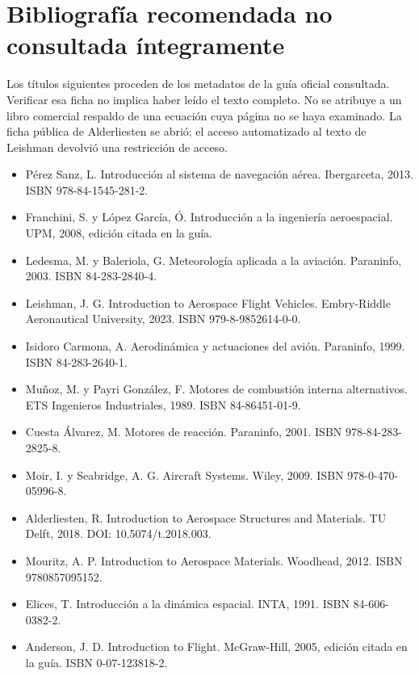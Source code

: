 \chapter*{Bibliografía recomendada no consultada íntegramente}
Los títulos siguientes proceden de los metadatos de la guía oficial consultada. Verificar esa ficha no implica haber leído el texto completo. No se atribuye a un libro comercial respaldo de una ecuación cuya página no se haya examinado. La ficha pública de Alderliesten se abrió; el acceso automatizado al texto de Leishman devolvió una restricción de acceso.
\begin{itemize}
\item Pérez Sanz, L. Introducción al sistema de navegación aérea. Ibergarceta, 2013. ISBN 978-84-1545-281-2.
\item Franchini, S. y López García, Ó. Introducción a la ingeniería aeroespacial. UPM, 2008, edición citada en la guía.
\item Ledesma, M. y Baleriola, G. Meteorología aplicada a la aviación. Paraninfo, 2003. ISBN 84-283-2840-4.
\item Leishman, J. G. Introduction to Aerospace Flight Vehicles. Embry-Riddle Aeronautical University, 2023. ISBN 979-8-9852614-0-0.
\item Isidoro Carmona, A. Aerodinámica y actuaciones del avión. Paraninfo, 1999. ISBN 84-283-2640-1.
\item Muñoz, M. y Payri González, F. Motores de combustión interna alternativos. ETS Ingenieros Industriales, 1989. ISBN 84-86451-01-9.
\item Cuesta Álvarez, M. Motores de reacción. Paraninfo, 2001. ISBN 978-84-283-2825-8.
\item Moir, I. y Seabridge, A. G. Aircraft Systems. Wiley, 2009. ISBN 978-0-470-05996-8.
\item Alderliesten, R. Introduction to Aerospace Structures and Materials. TU Delft, 2018. DOI: 10.5074/t.2018.003.
\item Mouritz, A. P. Introduction to Aerospace Materials. Woodhead, 2012. ISBN 9780857095152.
\item Elices, T. Introducción a la dinámica espacial. INTA, 1991. ISBN 84-606-0382-2.
\item Anderson, J. D. Introduction to Flight. McGraw-Hill, 2005, edición citada en la guía. ISBN 0-07-123818-2.
\end{itemize}
